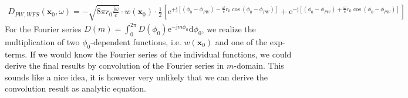 \documentclass[a4paper,BCOR=15mm,10pt,twoside]{scrartcl}
\begin{document}
\begin{align}
\label{eq:DPWWFS_FSPrep2}
D_{PW,WFS}(\mathbf{x}_0,\omega) = -\sqrt{8 \pi r_0 \frac{\mathrm{j \omega}}{c}} \cdot
w(\mathbf{x}_0) \cdot
\frac{1}{2}[
\mathrm{e}^{+\mathrm{j}[(\phi_0-\phi_{PW})-\frac{\omega}{c} r_0
\cos(\phi_0-\phi_{PW})]}
+\mathrm{e}^{-\mathrm{j}[(\phi_0-\phi_{PW})+\frac{\omega}{c} r_0
\cos(\phi_0-\phi_{PW})]}
]
\end{align}
For the Fourier series $D(m) = \int_0^{2\pi} D(\phi_0) \mathrm{e}^{-\mathrm{j} m \phi_0}\mathrm{d}\phi_0$, we realize the multiplication of two $\phi_0$-dependent functions, i.e. $w(\mathbf{x}_0)$ and one of the exp-terms. If we would know the Fourier series of the individual functions, we could derive the final results by convolution of the Fourier series in $m$-domain. This sounds like a nice idea, it is however very unlikely that we can derive the convolution result as analytic equation.
\end{document}
